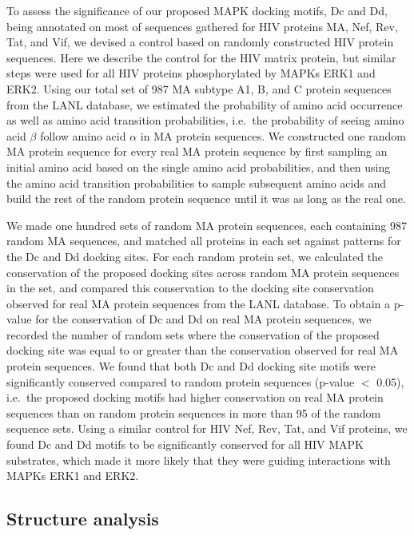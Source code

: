 To assess the significance of our proposed MAPK docking motifs, Dc and
Dd, being annotated on most of sequences gathered for HIV proteins MA,
Nef, Rev, Tat, and Vif, we devised a control based on randomly
constructed HIV protein sequences. Here we describe the control for
the HIV matrix protein, but similar steps were used for all HIV
proteins phosphorylated by MAPKs ERK1 and ERK2. Using our total set of
987 MA subtype A1, B, and C protein sequences from the LANL database,
we estimated the probability of amino acid occurrence as well as amino
acid transition probabilities, i.e.\ the probability of seeing amino
acid $\beta$ follow amino acid $\alpha$ in MA protein sequences. We
constructed one random MA protein sequence for every real MA protein
sequence by first sampling an initial amino acid based on the single
amino acid probabilities, and then using the amino acid transition
probabilities to sample subsequent amino acids and build the rest of
the random protein sequence until it was as long as the real one.

We made one hundred sets of random MA protein sequences, each
containing 987 random MA sequences, and matched all proteins in each
set against patterns for the Dc and Dd docking sites. For each random
protein set, we calculated the conservation of the proposed docking
sites across random MA protein sequences in the set, and compared this
conservation to the docking site conservation observed for real MA
protein sequences from the LANL database. To obtain a p-value for the
conservation of Dc and Dd on real MA protein sequences, we recorded
the number of random sets where the conservation of the proposed
docking site was equal to or greater than the conservation observed
for real MA protein sequences. We found that both Dc and Dd docking
site motifs were significantly conserved compared to random protein
sequences (p-value $<$ 0.05), i.e.\ the proposed docking motifs had
higher conservation on real MA protein sequences than on random
protein sequences in more than 95 of the random sequence sets. Using a
similar control for HIV Nef, Rev, Tat, and Vif proteins, we found Dc
and Dd motifs to be significantly conserved for all HIV MAPK
substrates, which made it more likely that they were guiding
interactions with MAPKs ERK1 and ERK2.

\subsection{Structure analysis}

